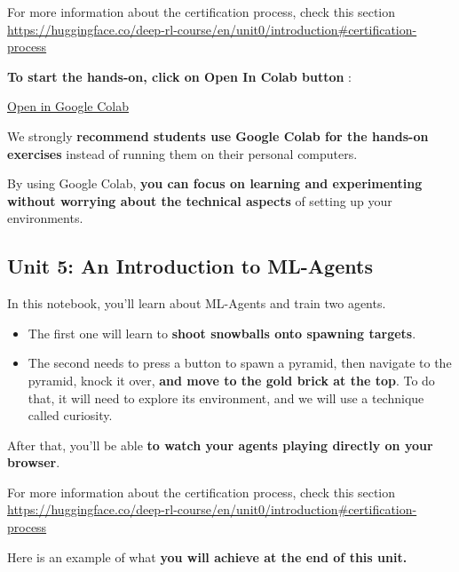 \documentclass[11pt,a4paper]{article}
\begin{document}
For more information about the certification process, check this section \url{https://huggingface.co/deep-rl-course/en/unit0/introduction#certification-process}

\textbf{To start the hands-on, click on Open In Colab button} :

\href{https://colab.research.google.com/github/huggingface/deep-rl-class/blob/master/notebooks/unit5/unit5.ipynb}{Open in Google Colab}

We strongly \textbf{recommend students use Google Colab for the hands-on exercises} instead of running them on their personal computers.

By using Google Colab, \textbf{you can focus on learning and experimenting without worrying about the technical aspects} of setting up your environments.

\subsection{Unit 5: An Introduction to ML-Agents}\label{unit-5-an-introduction-to-ml-agents}


In this notebook, you'll learn about ML-Agents and train two agents.

\begin{itemize}
\tightlist
\item
  The first one will learn to \textbf{shoot snowballs onto spawning targets}.
\item
  The second needs to press a button to spawn a pyramid, then navigate to the pyramid, knock it over, \textbf{and move to the gold brick at the top}. To do that, it will need to explore its environment, and we will use a technique called curiosity.
\end{itemize}

After that, you'll be able \textbf{to watch your agents playing directly on your browser}.

For more information about the certification process, check this section \url{https://huggingface.co/deep-rl-course/en/unit0/introduction#certification-process}

Here is an example of what \textbf{you will achieve at the end of this unit.}

\end{document}
